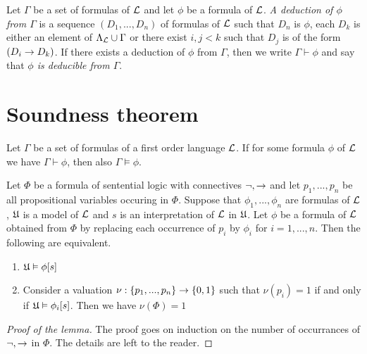 \documentclass[10pt]{amsart}
\begin{document}
\begin{definition}
	Let $\Gamma$ be a set of formulas of ${\mathcal L}$ and let $\phi$ be a formula of ${\mathcal L}$. \textit{A deduction of $\phi$ from $\Gamma$} is a sequence $(D_1 , ..., D_n)$ of formulas of ${\mathcal L}$ such that $D_n$ is $\phi$, each $D_k$ is either an element of $\Lambda_{\mathcal L} \cup \Gamma$ or there exist $i, j < k$ such that $D_j$ is of the form $(D_i \rightarrow D_k)$. If there exists a deduction of $\phi$ from $\Gamma$, then we write $\Gamma \vdash \phi$ and say that \textit{$\phi$ is deducible from $\Gamma$}.
\end{definition}

\section{Soundness theorem}

\begin{theorem}\label{theorem:soundness_theorem}
	Let $\Gamma$ be a set of formulas of a first order language ${\mathcal L}$. If for some formula $\phi$ of ${\mathcal L}$ we have $\Gamma \vdash \phi$, then also $\Gamma \vDash \phi$.
\end{theorem}

\begin{lemma}\label{lemma:classical_sentential_logic_holds_in_models}
	Let $\Phi$ be a formula of sentential logic with connectives $\neg, \rightarrow$ and let $p_1,...,p_n$ be all propositional variables occuring in $\Phi$. Suppose that $\phi_1,...,\phi_n$ are formulas of ${\mathcal L}$, ${\mathfrak U}$ is a model of ${\mathcal L}$ and $s$ is an interpretation of ${\mathcal L}$ in ${\mathfrak U}$. Let $\phi$ be a formula of ${\mathcal L}$ obtained from $\Phi$ by replacing each occurrence of $p_i$ by $\phi_i$ for $i = 1, ..., n$. Then the following are equivalent.
	\begin{enumerate}[label=\textbf{\emph{(\roman*)}}, leftmargin=3.0em]
		\item ${\mathfrak U} \vDash \phi[s]$
		\item Consider a valuation $\nu:\{p_1,...,p_n\} \rightarrow \{0, 1\}$ such that $\nu(p_i) = 1$ if and only if ${\mathfrak U} \vDash \phi_i[s]$. Then we have $\nu(\Phi) = 1$
	\end{enumerate}
\end{lemma}
\begin{proof}[Proof of the lemma]
	The proof goes on induction on the number of occurrances of $\neg, \rightarrow$ in $\Phi$. The details are left to the reader.
\end{proof}
\end{document}
